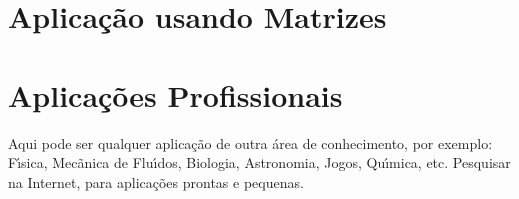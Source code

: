     \section{Aplica\c{c}\~{a}o usando Matrizes}


    \section{Aplica\c{c}\~{o}es Profissionais}
    Aqui pode ser qualquer aplica\c{c}\~{a}o de outra \'{a}rea de conhecimento, por exemplo: F\'{\i}sica, Mec\~{a}nica de Flu\'{\i}dos, Biologia, Astronomia, Jogos, Qu\'{\i}mica, etc. Pesquisar na Internet, para aplica\c{c}\~{o}es prontas e pequenas.

